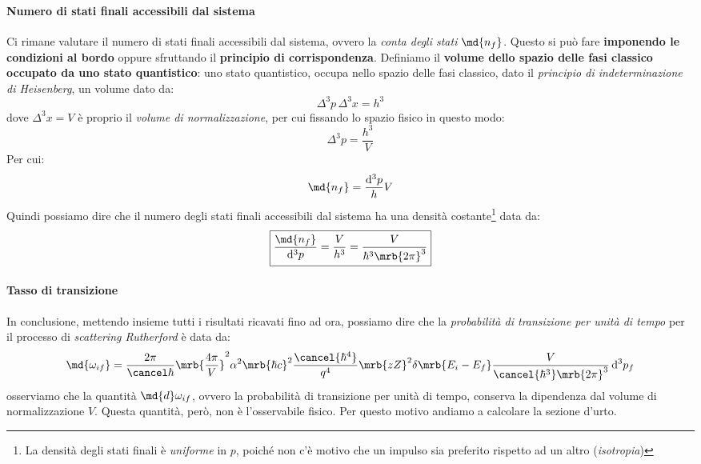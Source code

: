 \paragraph{Numero di stati finali accessibili dal sistema}
Ci rimane valutare il numero di stati finali accessibili dal sistema, ovvero la
\textit{conta degli stati} $\md{n_f}$.
Questo si può fare \textbf{imponendo le condizioni al bordo} oppure sfruttando
il \textbf{principio di corrispondenza}. Definiamo il \textbf{volume dello
	spazio delle fasi classico occupato da uno stato quantistico}: uno stato
quantistico, occupa nello spazio delle fasi classico, dato il \textit{principio
	di indeterminazione di Heisenberg}, un volume dato da:
\begin{equation}
	\boxed{\Delta^3p \, \Delta^3x = h^3}
\end{equation}
dove $\Delta^3x = V$ è proprio il \textit{volume di normalizzazione}, per cui
fissando lo spazio fisico in questo modo:
\begin{equation}
	\Delta^3p = \frac{h^3}{V}
\end{equation}
Per cui:
\begin{equation}
	\md{n_f} = \frac{\mathrm{d}^3p}{h}V
\end{equation}
Quindi possiamo dire che il numero degli stati finali accessibili dal sistema
ha una densità costante\footnote{
	La densità degli stati finali è \textit{uniforme} in $p$, poiché non c'è
	motivo che un impulso sia preferito rispetto ad un altro (\textit{isotropia})
} data da:
\begin{equation}
	\boxed{
		\frac{\md{n_f}}{\mathrm{d}^3p} = \frac{V}{h^3} = \frac{V}{\hbar^3
			\mrb{2\pi}^3}
	}
\end{equation}

\paragraph{Tasso di transizione}
In conclusione, mettendo insieme tutti i risultati ricavati fino ad ora,
possiamo dire che la \textit{probabilità di transizione per unità di tempo} per
il processo di \textit{scattering Rutherford} è data da:
\begin{equation}
	\md{\omega_{if}} = \frac{2\pi}{\cancel\hbar} \mrb{\frac{4\pi}{V}}^2 \alpha^2
	\mrb{\hbar c}^2 \frac{\cancel{\hbar^4}}{q^4} \mrb{zZ}^2
	\delta\mrb{E_i - E_f} \frac{V}{\cancel{\hbar^3} \mrb{2\pi}^3} \,
	\mathrm{d}^3p_f
	\label{eq:prob_transizione_unita_tempo}
\end{equation}
osserviamo che la quantità $\md{d}\omega_{if}$, ovvero la probabilità di
transizione per unità di tempo, conserva la dipendenza dal volume di
normalizzazione $V$. Questa quantità, però, non è l'osservabile fisico. Per
questo motivo andiamo a calcolare la sezione d'urto.

